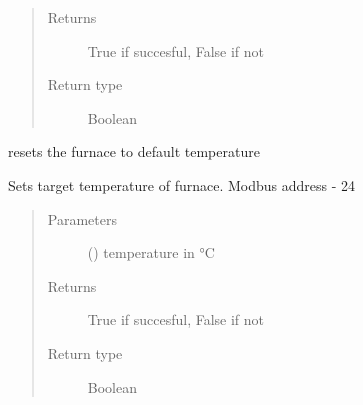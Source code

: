 \documentclass[letterpaper,10pt,english]{sphinxmanual}
\begin{document}
\begin{fulllineitems}
\begin{fulllineitems}
\begin{quote}
\begin{description}
\begin{itemize}
\end{itemize}

\item[{Returns}] \leavevmode
True if succesful, False if not

\item[{Return type}] \leavevmode
Boolean

\end{description}\end{quote}

\end{fulllineitems}


\begin{fulllineitems}
\label{\detokenize{source/laboratory.drivers:laboratory.drivers.furnace.Furnace.reset}}
resets the furnace to default temperature

\end{fulllineitems}


\begin{fulllineitems}
\label{\detokenize{source/laboratory.drivers:laboratory.drivers.furnace.Furnace.setpoint_1}}
Sets target temperature of furnace.
Modbus address - 24
\begin{quote}\begin{description}
\item[{Parameters}] \leavevmode
{} (\sphinxstyleliteralemphasis{\sphinxupquote{, }}) \textendash{} temperature in °C

\item[{Returns}] \leavevmode
True if succesful, False if not

\item[{Return type}] \leavevmode
Boolean

\end{description}\end{quote}

\end{fulllineitems}


\end{fulllineitems}
\end{document}
